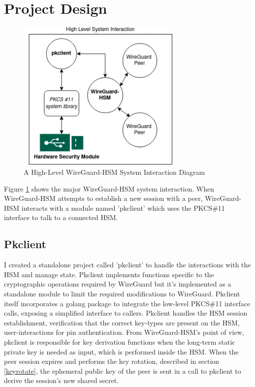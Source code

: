 \documentclass [11pt, proquest] {uwthesis}[2020/02/24]
\begin{document}
\section{Project Design}
\begin{figure}[ht]
\begin{center}
\includegraphics[width=8cm]{paper/images/high-level-overview.png}
\caption{A High-Level WireGuard-HSM System Interaction Diagram}
\label{fig:highlevel_system}
\end{center}
\end{figure}

Figure \ref{fig:highlevel_system} shows the major WireGuard-HSM system interaction. When WireGuard-HSM attempts to establish a new session with a peer, WireGuard-HSM interacts with a module named 'pkclient' which uses the PKCS\#11 interface to talk to a connected HSM. 

\subsection{Pkclient}
\label{pk_design}
I created a standalone project called 'pkclient' to handle the interactions with the HSM and manage state. Pkclient implements functions specific to the cryptographic operations required by WireGuard but it's implemented as a standalone module to limit the required modifications to WireGuard. Pkclient itself incorporates a golang package to integrate the low-level PKCS\#11 interface calls, exposing a simplified interface to callers.  Pkclient handles the HSM session establishment, verification that the correct key-types are present on the HSM, user-interactions for pin authentication. 
From WireGuard-HSM's point of view, pkclient is responsible for key derivation functions when the long-term static private key is needed as input, which is performed inside the HSM. When the peer session expires and performs the key rotation, described in section \ref{keyrotate}, the ephemeral public key of the peer is sent in a call to pkclient to derive the session's new shared secret. 
\end{document}
